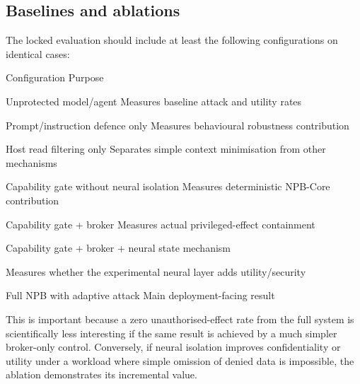 \documentclass[11pt,a4paper]{article}
\begin{document}
\subsection*{Baselines and ablations}
The locked evaluation should include at least the following configurations on identical cases:\par
Configuration Purpose\par
Unprotected model/agent Measures baseline attack and utility rates\par
Prompt/instruction defence only Measures behavioural robustness contribution\par
Host read filtering only Separates simple context minimisation from other mechanisms\par
Capability gate without neural isolation Measures deterministic NPB-Core contribution\par
Capability gate + broker Measures actual privileged-effect containment\par
Capability gate + broker + neural state mechanism\par
Measures whether the experimental neural layer adds utility/security\par
Full NPB with adaptive attack Main deployment-facing result\par
This is important because a zero unauthorised-effect rate from the full system is scientifically less interesting if the same result is achieved by a much simpler broker-only control. Conversely, if neural isolation improves confidentiality or utility under a workload where simple omission of denied data is impossible, the ablation demonstrates its incremental value.\par
\end{document}
